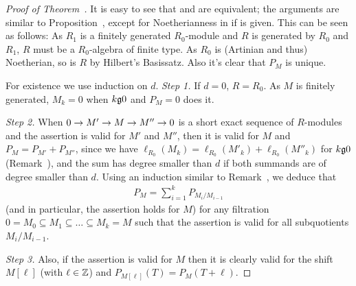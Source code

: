 \documentclass[a4paper,parskip=half,numbers=enddot, DIV=12]{scrreprt}
\begin{document}
\begin{proof}[Proof of Theorem~]
    It is easy to see that  and  are equivalent; the arguments are similar to Proposition~, except for Noetherianness in  if  is given. This can be seen as follows: As $R_1$ is a finitely generated $R_0$-module and $R$ is generated by $R_0$ and $R_1$, $R$ must be a $R_0$-algebra of finite type. As $R_0$ is (Artinian and thus) Noetherian, so is $R$ by Hilbert's Basissatz. Also it's clear that $P_M$ is unique.
    
    For existence we use induction on $d$. \emph{Step 1.} If $d=0$, $R=R_0$. As $M$ is finitely generated, $M_k = 0$ when $k\gge0$ and $P_M =0$ does it. 
    
    \emph{Step 2.} When $0\morphism M'\morphism M\morphism M'' \morphism 0$ is a short exact sequence of $R$-modules and the assertion is valid for $M'$ and $M''$, then it is valid for $M$ and $P_M = P_{M'} +P_{M''}$, since we have $\ell_{R_0}(M_k) = \ell_{R_0}(M'_k)+\ell_{R_0}(M''_k) $ for $k\gge 0$ (Remark~), and the sum has degree smaller than $d$ if both summands are of degree smaller than $d$. Using an induction similar to Remark~, we deduce that 
    \begin{align*}
    	P_M=\sum_{i=1}^kP_{M_i/M_{i-1}}
    \end{align*}
    (and in particular, the assertion holds for $M$) for any filtration $0=M_0\subseteq M_1\subseteq\ldots\subseteq M_k=M$ such that the assertion is valid for all subquotients $M_i/M_{i-1}$. 
    
    \emph{Step 3.} Also, if the assertion is valid for $M$ then it is clearly valid for the shift $M[\ell]$ (with $\ell\in\mathbb{Z}$) and $P_{M[\ell]}(T) = P_M(T+\ell)$. 
    

\end{proof}
\end{document}
